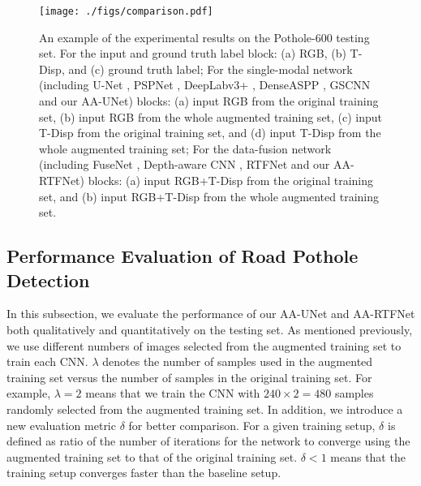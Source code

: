 \documentclass[runningheads]{llncs}
\begin{document}
\begin{figure}[!htbp]
	\centering
	\texttt{[image: ./figs/comparison.pdf]}
	\caption{An example of the experimental results on the Pothole-600 testing set. For the input and ground truth label block: (a) RGB, (b) T-Disp, and (c) ground truth label; For the single-modal network (including U-Net \cite{ronneberger2015u}, PSPNet \cite{zhao2017pyramid}, DeepLabv3+ \cite{chen2018encoder}, DenseASPP \cite{yang2018denseaspp}, GSCNN \cite{takikawa2019gated} and our AA-UNet) blocks: (a) input RGB from the original training set, (b) input RGB from the whole augmented training set, (c) input T-Disp from the original training set, and (d) input T-Disp from the whole augmented training set; For the data-fusion network (including FuseNet \cite{hazirbas2016fusenet}, Depth-aware CNN \cite{wang2018depth}, RTFNet \cite{sun2019rtfnet} and our AA-RTFNet) blocks: (a) input RGB+T-Disp from the original training set, and (b) input RGB+T-Disp from the whole augmented training set.}
	\label{fig.comparison}
\end{figure}

\subsection{Performance Evaluation of Road Pothole Detection}
\label{sec.performance_evaluation}
In this subsection, we evaluate the performance of our AA-UNet and AA-RTFNet both qualitatively and quantitatively on the testing set. As mentioned previously, we use different numbers of images selected from the augmented training set to train each CNN.  $\lambda$ denotes the number of samples used in the augmented training set versus the number of samples in the original training set. For example, $\lambda=2$ means that we train the CNN with $240 \times 2 = 480$ samples randomly selected from the augmented training set. In addition, we introduce a new evaluation metric $\delta$ for better comparison. For a given training setup, $\delta$ is defined as ratio of the number of iterations for the network to converge using the augmented training set to that of the original training set. $\delta < 1$ means that the training setup converges faster than the baseline setup.
\end{document}
